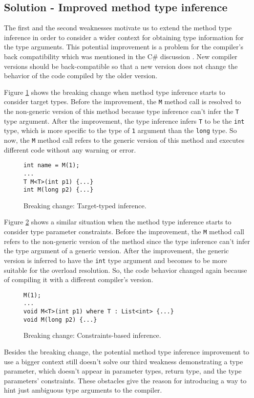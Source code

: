 \subsection{Solution - Improved method type inference}

The first and the second weaknesses motivate us to extend the method type inference in order to consider a wider context for obtaining type information for the type arguments. 
This potential improvement is a problem for the compiler's back compatibility which was mentioned in the C\# discussion \cite{online:breakingChange}. 
New compiler versions should be back-compatible so that a new version does not change the behavior of the code compiled by the older version.
\par

Figure \ref{img30:breakingChange1} shows the breaking change when method type inference starts to consider target types. 
Before the improvement, the \texttt{M} method call is resolved to the non-generic version of this method because type inference can’t infer the \texttt{T} type argument. 
After the improvement, the type inference infers \texttt{T} to be the \texttt{int} type, which is more specific to the type of \texttt{1} argument than the \texttt{long} type. 
So now, the \texttt{M} method call refers to the generic version of this method and executes different code without any warning or error.
\begin{figure}[h]
\begin{lstlisting}[style=csharp]
int name = M(1);
...
T M<T>(int p1) {...}
int M(long p2) {...}
\end{lstlisting}
\caption{Breaking change: Target-typed inference.}
\label{img30:breakingChange1}
\end{figure}
\par
Figure \ref{img31:breakingChange2} shows a similar situation when the method type inference starts to consider type parameter constraints. 
Before the improvement, the \texttt{M} method call refers to the non-generic version of the method since the type inference can’t infer the type argument of a generic version. 
After the improvement, the generic version is inferred to have the \texttt{int} type argument and becomes to be more suitable for the overload resolution. 
So, the code behavior changed again because of compiling it with a different compiler's version.
\begin{figure}[h]
\begin{lstlisting}[style=csharp]
M(1);
...
void M<T>(int p1) where T : List<int> {...}
void M(long p2) {...}
\end{lstlisting}
\caption{Breaking change: Constraints-based inference.}
\label{img31:breakingChange2}
\end{figure}
\par
Besides the breaking change, the potential method type inference improvement to use a bigger context still doesn’t solve our third weakness demonstrating a type parameter, which doesn’t appear in parameter types, return type, and the type parameters’ constraints. 
These obstacles give the reason for introducing a way to hint just ambiguous type arguments to the compiler.

